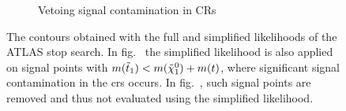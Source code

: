 \begin{figure}[H]
\begin{subfigure}[b]{0.47\textwidth}
		\caption{Vetoing signal contamination in CRs\label{fig:exclusion_stop1L_noLabel_v2_withoutCRs}}
	\end{subfigure}\hfill
	\caption{The contours obtained with the full and simplified likelihoods of the ATLAS stop search. In fig.~ the simplified likelihood is also applied on signal points with $m(\tilde{t}_1) < m(\tilde{\chi}_1^0)+m(t)$, where significant signal contamination in the \glspl{cr} occurs. In fig.~, such signal points are removed and thus not evaluated using the simplified likelihood.}\label{fig:limitations_simplied_stop1l}
\end{figure}


%
%


\FloatBarrier


